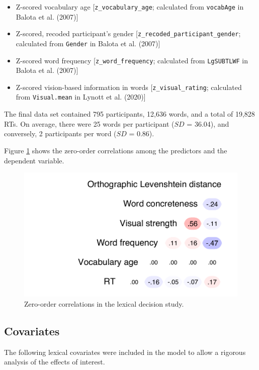 \documentclass[
  12pt,
  man,floatsintext]{apa7}
\begin{document}
\begin{itemize}
\item
  Z-scored vocabulary age {[}\texttt{z\_vocabulary\_age}; calculated from \texttt{vocabAge} in Balota et al. (2007){]}
\item
  Z-scored, recoded participant's gender {[}\texttt{z\_recoded\_participant\_gender}; calculated from \texttt{Gender} in Balota et al. (2007){]}
\item
  Z-scored word frequency {[}\texttt{z\_word\_frequency}; calculated from \texttt{LgSUBTLWF} in Balota et al. (2007){]}
\item
  Z-scored vision-based information in words {[}\texttt{z\_visual\_rating}; calculated from \texttt{Visual.mean} in Lynott et al. (2020){]}
\end{itemize}

The final data set contained 795 participants, 12,636 words, and a total of 19,828 RTs. On average, there were 25 words per participant (\(SD\) = 36.04), and conversely, 2 participants per word (\(SD\) = 0.86).

Figure \ref{fig:lexicaldecision-correlations} shows the zero-order correlations among the predictors and the dependent variable.

\begin{figure}

{\centering \includegraphics[width=0.5\linewidth]{manuscript_files/figure-latex/lexicaldecision-correlations-1} 

}

\caption{Zero-order correlations in the lexical decision study.}\label{fig:lexicaldecision-correlations}
\end{figure}

\hypertarget{covariates-2}{%
\subsection{Covariates}\label{covariates-2}}

The following lexical covariates were included in the model to allow a rigorous analysis of the effects of interest.
\end{document}
